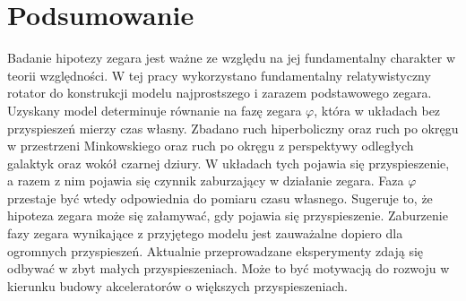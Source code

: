 \section{Podsumowanie}
Badanie hipotezy zegara jest ważne ze względu na jej 
fundamentalny charakter w teorii względności. 
W tej pracy wykorzystano fundamentalny relatywistyczny rotator 
do konstrukcji modelu najprostszego i zarazem podstawowego 
zegara. Uzyskany model determinuje równanie na fazę zegara $\varphi$,
która w układach bez przyspieszeń mierzy czas własny. 
Zbadano ruch hiperboliczny oraz ruch po okręgu 
w przestrzeni Minkowskiego oraz
ruch po okręgu z perspektywy odległych galaktyk oraz wokół czarnej 
dziury.
W układach tych pojawia się przyspieszenie, a razem z nim  
pojawia się czynnik zaburzający w działanie zegara. 
Faza $\varphi$ przestaje być wtedy odpowiednia do pomiaru 
 czasu własnego. Sugeruje to, że hipoteza zegara może 
się załamywać, gdy pojawia się przyspieszenie. 
Zaburzenie fazy zegara wynikające z przyjętego modelu
 jest zauważalne dopiero dla
 ogromnych przyspieszeń.
Aktualnie przeprowadzane eksperymenty zdają się odbywać w zbyt małych 
przyspieszeniach. Może to być motywacją do rozwoju w kierunku 
budowy akceleratorów o większych przyspieszeniach.
